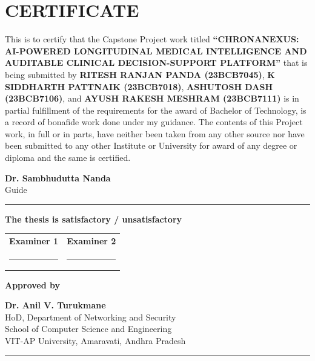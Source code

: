 \chapter*{CERTIFICATE}

\enlargethispage{2\baselineskip}

This is to certify that the Capstone Project work titled \textbf{``CHRONANEXUS: AI-POWERED LONGITUDINAL MEDICAL INTELLIGENCE AND AUDITABLE CLINICAL DECISION-SUPPORT PLATFORM''} that is being submitted by \textbf{RITESH RANJAN PANDA (23BCB7045)}, \textbf{K SIDDHARTH PATTNAIK (23BCB7018)}, \textbf{ASHUTOSH DASH (23BCB7106)}, and \textbf{AYUSH RAKESH MESHRAM (23BCB7111)} is in partial fulfillment of the requirements for the award of Bachelor of Technology, is a record of bonafide work done under my guidance. The contents of this Project work, in full or in parts, have neither been taken from any other source nor have been submitted to any other Institute or University for award of any degree or diploma and the same is certified.

\vspace{0.8cm}

\begin{flushright}
\textbf{Dr. Sambhudutta Nanda}\\
Guide\\[0.8cm]
\rule{5.5cm}{0.4pt}
\end{flushright}

\vspace{0.5cm}

\noindent
\textbf{The thesis is satisfactory / unsatisfactory}

\vspace{0.8cm}

\noindent
\begin{tabular}{p{} p{}}
\textbf{Examiner 1} & \textbf{Examiner 2} \\[1.0cm]
\rule{5.5cm}{0.4pt} & \rule{5.5cm}{0.4pt} \\
\end{tabular}

\vspace{0.8cm}

\noindent
\textbf{Approved by}

\vspace{0.4cm}

\noindent
\textbf{Dr. Anil V. Turukmane}\\
HoD, Department of Networking and Security\\
School of Computer Science and Engineering\\
VIT-AP University, Amaravati, Andhra Pradesh\\[0.8cm]
\rule{6.5cm}{0.4pt}
